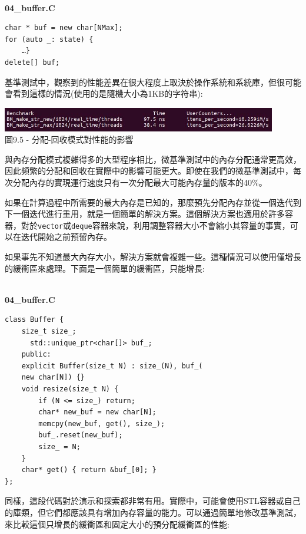 \hspace*{\fill} \\ %
\noindent
\textbf{04\_buffer.C}
\begin{lstlisting}[style=styleCXX]
char * buf = new char[NMax];
for (auto _: state) {
	…}
delete[] buf;
\end{lstlisting}

基準測試中，觀察到的性能差異在很大程度上取決於操作系統和系統庫，但很可能會看到這樣的情況(使用的是隨機大小為1KB的字符串):

\begin{center}
\includegraphics[width=0.9\textwidth]{content/3/chapter9/images/5.jpg}\\
圖9.5 - 分配-回收模式對性能的影響
\end{center}

與內存分配模式複雜得多的大型程序相比，微基準測試中的內存分配通常更高效，因此頻繁的分配和回收在實際中的影響可能更大。即使在我們的微基準測試中，每次分配內存的實現運行速度只有一次分配最大可能內存量的版本的40\%。 

如果在計算過程中所需要的最大內存是已知的，那麼預先分配內存並從一個迭代到下一個迭代進行重用，就是一個簡單的解決方案。這個解決方案也適用於許多容器，對於\texttt{vector}或\texttt{deque}容器來說，利用調整容器大小不會縮小其容量的事實，可以在迭代開始之前預留內存。

如果事先不知道最大內存大小，解決方案就會複雜一些。這種情況可以使用僅增長的緩衝區來處理。下面是一個簡單的緩衝區，只能增長:

\hspace*{\fill} \\ %
\noindent
\textbf{04\_buffer.C}
\begin{lstlisting}[style=styleCXX]
class Buffer {
	size_t size_;
	  std::unique_ptr<char[]> buf_;
	public:
	explicit Buffer(size_t N) : size_(N), buf_(
	new char[N]) {}
	void resize(size_t N) { 
		if (N <= size_) return;
		char* new_buf = new char[N];
		memcpy(new_buf, get(), size_);
		buf_.reset(new_buf);
		size_ = N;
	}
	char* get() { return &buf_[0]; }
};
\end{lstlisting}

同樣，這段代碼對於演示和探索都非常有用。實際中，可能會使用STL容器或自己的庫類，但它們都應該具有增加內存容量的能力。可以通過簡單地修改基準測試，來比較這個只增長的緩衝區和固定大小的預分配緩衝區的性能:

